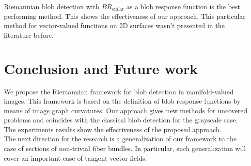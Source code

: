 \documentclass{llncs}
\newcommand{\FRScalar}{BR_{\mathrm{scalar}}}
\begin{document}
Riemannian blob detection with $\FRScalar$ as a blob response function is the best performing method. This shows the effectiveness of our approach. This particular method for vector-valued functions on 2D surfaces wasn't presented in the literature before. 

\section{Conclusion and Future work}
We propose the Riemannian framework for blob detection in manifold-valued images. This framework is based on the definition of blob response functions by means of image graph curvatures. Our approach gives new methods for uncovered problems and coincides with the classical blob detection for the grayscale case. The experiments results show the effectiveness of the proposed approach.
\\
The next direction for the research is a generalization of our framework to the case of sections of non-trivial fiber bundles. In particular, such generalization will cover an important case of tangent vector fields.
\end{document}
